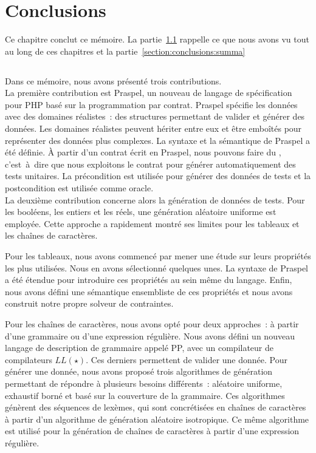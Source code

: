\chapter{Conclusions}
\label{chapter:conclusions}

\minitoc

Ce chapitre conclut ce mémoire. La partie~\ref{section:conclusions:recapitulare}
rappelle ce que nous avons vu tout au long de ces chapitres et la
partie~\ref{section:conclusions:summa}

\section{}
\label{section:conclusions:recapitulare}

Dans ce mémoire, nous avons présenté trois contributions. \\

La première contribution est Praspel, un nouveau de langage de spécification
pour PHP basé sur la programmation par contrat. Praspel spécifie les données
avec des domaines réalistes~: des structures permettant de valider et générer
des données. Les domaines réalistes peuvent hériter entre eux et être emboîtés
pour représenter des données plus complexes. La syntaxe et la sémantique de
Praspel a été définie.  À partir d'un contrat écrit en Praspel, nous pouvons
faire du , c'est~à~dire que nous exploitons le
contrat pour générer automatiquement des tests unitaires. La précondition est
utilisée pour générer des données de tests et la postcondition est utilisée
comme oracle.  \\

La deuxième contribution concerne alors la génération de données de tests. Pour
les booléens, les entiers et les réels, une génération aléatoire uniforme est
employée. Cette approche a rapidement montré ses limites pour les tableaux et
les chaînes de caractères.

Pour les tableaux, nous avons commencé par mener une étude sur leurs propriétés
les plus utilisées. Nous en avons sélectionné quelques unes. La syntaxe de
Praspel a été étendue pour introduire ces propriétés au sein même du langage.
Enfin, nous avons défini une sémantique ensembliste de ces propriétés et nous
avons construit notre propre solveur de contraintes.

Pour les chaînes de caractères, nous avons opté pour deux approches~: à partir
d'une grammaire ou d'une expression régulière. Nous avons défini un nouveau
langage de description de grammaire appelé PP, avec un compilateur de
compilateurs $LL(\star)$. Ces derniers permettent de valider une donnée. Pour
générer une donnée, nous avons proposé trois algorithmes de génération
permettant de répondre à plusieurs besoins différents~: aléatoire uniforme,
exhaustif borné et basé sur la couverture de la grammaire. Ces algorithmes
génèrent des séquences de lexèmes, qui sont concrétisées en chaînes de
caractères à partir d'un algorithme de génération aléatoire isotropique. Ce même
algorithme est utilisé pour la génération de chaînes de caractères à partir
d'une expression régulière.

